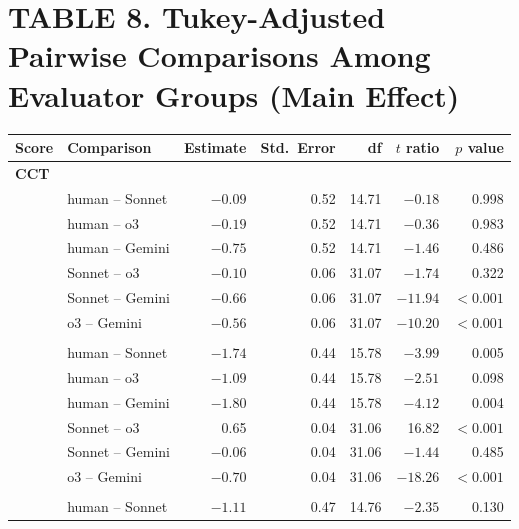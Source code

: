 \documentclass{wiley-article}
\begin{document}
\begin{table}[H]
  \section*{TABLE 8. Tukey-Adjusted Pairwise Comparisons Among Evaluator Groups (Main Effect)}
  \centering
  \footnotesize
  \setlength{\tabcolsep}{4pt}
  \begin{threeparttable}
    \label{tab:tukey_evaluator}
    \begin{tabular}{l p{} r r r r r}
      \toprule
      \textbf{Score} & \textbf{Comparison} & \textbf{Estimate} &
      \textbf{Std.\ Error} & \textbf{df} & \textbf{$t$ ratio} & \textbf{$p$ value} \\
      \midrule
      \multicolumn{7}{l}{\textbf{CCT}}\\
        & human – Sonnet   & $-0.09$ & 0.52 & 14.71 & $-0.18$ & 0.998 \\
        & human – o3       & $-0.19$ & 0.52 & 14.71 & $-0.36$ & 0.983 \\
        & human – Gemini   & $-0.75$ & 0.52 & 14.71 & $-1.46$ & 0.486 \\
        & Sonnet – o3      & $-0.10$ & 0.06 & 31.07 & $-1.74$ & 0.322 \\
        & Sonnet – Gemini  & $-0.66$ & 0.06 & 31.07 & $-11.94$ & $<\!0.001$ \\
        & o3 – Gemini      & $-0.56$ & 0.06 & 31.07 & $-10.20$ & $<\!0.001$ \\
      \addlinespace
      \multicolumn{7}{l}{\textbf{SST}}\\
        & human – Sonnet   & $-1.74$ & 0.44 & 15.78 & $-3.99$ & 0.005 \\
        & human – o3       & $-1.09$ & 0.44 & 15.78 & $-2.51$ & 0.098 \\
        & human – Gemini   & $-1.80$ & 0.44 & 15.78 & $-4.12$ & 0.004 \\
        & Sonnet – o3      &  0.65   & 0.04 & 31.06 & 16.82   & $<\!0.001$ \\
        & Sonnet – Gemini  & $-0.06$ & 0.04 & 31.06 & $-1.44$ & 0.485 \\
        & o3 – Gemini      & $-0.70$ & 0.04 & 31.06 & $-18.26$& $<\!0.001$ \\
      \addlinespace
      \multicolumn{7}{l}{\textbf{PAR}}\\
        & human – Sonnet   & $-1.11$ & 0.47 & 14.76 & $-2.35$ & 0.130 \\

\end{tabular}
\end{threeparttable}
\end{table}
\end{document}
